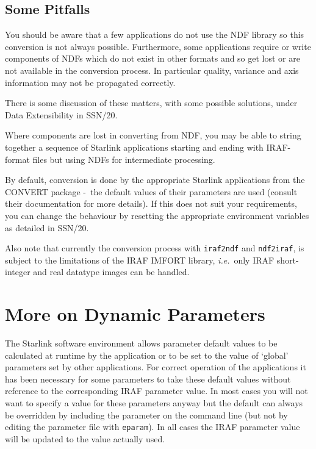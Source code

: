 \documentclass[twoside,11pt]{article}
\newcommand{\xref}[3]{#1}
\newcommand{\xlabel}[1]{}
\newcommand{\dash}{--}
\renewcommand{\dash}{-}
\begin{document}
\subsection{\xlabel{some_pitfalls}Some Pitfalls}
You should be aware that a few applications do not use the NDF library so
this conversion is not always possible.
Furthermore, some applications require or write components of NDFs which do
not exist in other formats and so get lost or are not available in the
conversion process.
In particular quality, variance and axis information may not be propagated
correctly.

There is some discussion of these matters, with some possible solutions, under
\xref{Data Extensibility}{ssn20}{general_principles_of_extensibility}
in SSN/20.

Where components are lost in converting from NDF, you may be able
to string together a sequence of Starlink applications starting and
ending with IRAF-format files but using NDFs for intermediate processing.

By default, conversion is done by the appropriate Starlink applications from
the
\xref{CONVERT}{sun55}{}
package \dash\ the default values of their
parameters are used (consult their documentation for more details).
If this does not suit your requirements, you can change the behaviour by
resetting the appropriate environment variables as detailed in
\xref{SSN/20}{ssn20}{}.

Also note that currently the conversion process with
\xref{\texttt{iraf2ndf}}{sun55}{IRAF2NDF}
and
\xref{\texttt{ndf2iraf}}{sun55}{NDF2IRAF},
is subject to the limitations of the IRAF IMFORT library, \textit{i.e.}\ only
IRAF short-integer and real datatype images can be handled.

\section{\xlabel{more_on_dynamic_parameters}\label{more_on_dynamic_parameters}More on Dynamic Parameters}
The Starlink software environment allows parameter default values to be
calculated at runtime by the application or to be set to the value of
`global' parameters set by other applications.
For correct operation of the applications
it has been necessary for some parameters to take these default values without
reference to the corresponding IRAF parameter value.
In most cases you will not want to specify a value for these parameters
anyway but the default can always be overridden by including the parameter on
the command line (but not by editing the parameter file with \texttt{eparam}).
In all cases the IRAF parameter value will be updated to the value actually
used.
\end{document}

